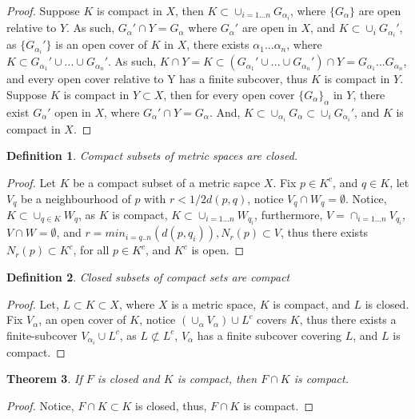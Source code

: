 \documentclass{amsart}
\numberwithin{equation}{section}
\theoremstyle{plain}
\newtheorem{thm}{Theorem}[section]
\newtheorem{dfn}[thm]{Definition}
\theoremstyle{definition}
\begin{document}
\begin{proof}
  Suppose $K$ is compact in $X$, then $K \subset \cup_{i = 1 ... n} G_{\alpha_i}$, where $\{G_{\alpha}\}$ are open relative to $Y$.
  As such, $G_\alpha' \cap Y = G_\alpha$ where $G_\alpha'$ are open in $X$, and $ K \subset \cup_i G_{\alpha_i}'$, as $\{G_{\alpha_i}'\}$ 
  is an open cover of $K$ in $X$, there exists $\alpha_1...\alpha_n$, where $K \subset G_{\alpha_1}' \cup ... \cup G_{\alpha_n}'$. As such,
  $K \cap Y = K \subset (G_{\alpha_1}' \cup ... \cup G_{\alpha_n}') \cap Y = G_{\alpha_1} ... G_{\alpha_n}$, and every open cover relative to Y
  has a finite subcover, thus $K$ is compact in $Y$.\\
  Suppose $K$ is compact in $Y \subset X$, then for every open cover $\{G_{\alpha}\}_{\alpha}$ in $Y$,
  there exist $G_{\alpha}' $ open in $X$, where $G_{\alpha}' \cap Y = G_{\alpha}$. And, $K \subset \cup_{\alpha_i} G_{\alpha} \subset \cup_i G_{\alpha_i}'$,
  and $K$ is compact in $X$.
\end{proof}

\begin{dfn}
  Compact subsets of metric spaces are closed.
\end{dfn}
\begin{proof}
  Let $K$ be a compact subset of a metric sapce $X$. Fix $p \in K^c$, and $q \in K$, 
  let $V_q$ be a neighbourhood of $p$ with $r < 1/2d(p,q)$, notice $V_q \cap W_q = \emptyset$.
  Notice, $ K \subset \cup_{q \in K} W_q$, as $K$ is compact, $K \subset \cup_{i = 1...n} W_{q_i}$, furthermore,
  $V = \cap_{i = 1...n} V_{q_i}$, $V \cap W = \emptyset$, and $r = min_{i = q..n}(d(p, q_i)), N_r(p) \subset V$, thus
  there exists $N_r(p) \subset K^c$, for all $p \in K^c$, and $K^c$ is open.
\end{proof}

\begin{dfn}
  Closed subsets of compact sets are compact
\end{dfn}
\begin{proof}
  Let, $L \subset K \subset X$, where $X$ is a metric space, $K$ is compact, and $L$ is closed.
  Fix $V_{\alpha}$, an open cover of $K$, notice $( \cup_{\alpha} V_{\alpha} ) \cup L^c$ covers $K$, thus
  there exists a finite-subcover $V_{\alpha_i} \cup L^c$, as $L \not \subset L^c$, $V_{\alpha}$ has a finite subcover
  covering $L$, and $L$ is compact.
\end{proof}

\begin{thm}
  If $F$ is closed and $K$ is compact, then $F \cap K$ is compact.
\end{thm}
\begin{proof}
  Notice, $F \cap K \subset K$ is closed, thus, $F \cap K$ is compact.
\end{proof}
\end{document}
